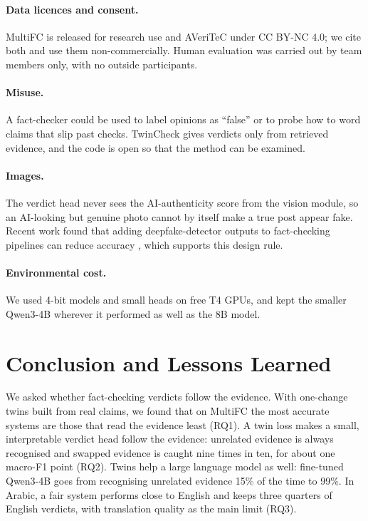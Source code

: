 \paragraph{Data licences and consent.}
MultiFC is released for research use and AVeriTeC under CC BY-NC 4.0; we cite both and use them non-commercially. Human evaluation was carried out by team members only, with no outside participants.

\paragraph{Misuse.}
A fact-checker could be used to label opinions as ``false'' or to probe how to word claims that slip past checks. TwinCheck gives verdicts only from retrieved evidence, and the code is open so that the method can be examined.

\paragraph{Images.}
The verdict head never sees the AI-authenticity score from the vision module, so an AI-looking but genuine photo cannot by itself make a true post appear fake. Recent work found that adding deepfake-detector outputs to fact-checking pipelines can reduce accuracy \citep{sagar2026factorfake}, which supports this design rule.

\paragraph{Environmental cost.}
We used 4-bit models and small heads on free T4 GPUs, and kept the smaller Qwen3-4B wherever it performed as well as the 8B model.

\section{Conclusion and Lessons Learned}

We asked whether fact-checking verdicts follow the evidence. With one-change twins built from real claims, we found that on MultiFC the most accurate systems are those that read the evidence least (RQ1). A twin loss makes a small, interpretable verdict head follow the evidence: unrelated evidence is always recognised and swapped evidence is caught nine times in ten, for about one macro-F1 point (RQ2). Twins help a large language model as well: fine-tuned Qwen3-4B goes from recognising unrelated evidence 15\% of the time to 99\%. In Arabic, a fair system performs close to English and keeps three quarters of English verdicts, with translation quality as the main limit (RQ3).

